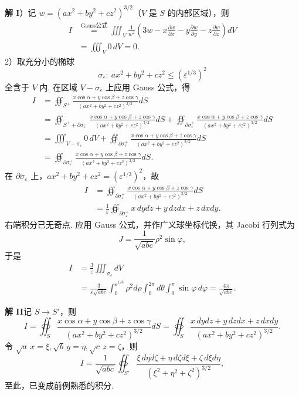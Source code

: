 \documentclass[UTF8, 12pt, fontset=fandol, oneside]{ctexart}
\providecommand{\xlongequal}[1]{\overset{#1}{=}}
\begin{document}
\noindent\textbf{解 I}）记 $w=(ax^2+by^2+cz^2)^{3/2}$（$V$ 是 $S$ 的内部区域），则
\[
\begin{aligned}
I&\xlongequal{\text{Gauss公式}}\iiint_V\frac1{w^2}\left(3w-x\frac{\partial w}{\partial x}-y\frac{\partial w}{\partial y}-z\frac{\partial w}{\partial z}\right)dV\\
&=\iiint_V0\,dV=0.
\end{aligned}
\]
2）取充分小的椭球
\[
\sigma_\varepsilon:\ ax^2+by^2+cz^2\le(\varepsilon^{1/3})^2
\]
全含于 $V$ 内. 在区域 $V-\sigma_\varepsilon$ 上应用 Gauss 公式，得
\[
\begin{aligned}
I&=\oiint_{S^+}\frac{x\cos\alpha+y\cos\beta+z\cos\gamma}{(ax^2+by^2+cz^2)^{3/2}}dS\\
&=\oiint_{S^++\partial\sigma_\varepsilon^-}\frac{x\cos\alpha+y\cos\beta+z\cos\gamma}{(ax^2+by^2+cz^2)^{3/2}}dS
+\oiint_{\partial\sigma_\varepsilon^+}\frac{x\cos\alpha+y\cos\beta+z\cos\gamma}{(ax^2+by^2+cz^2)^{3/2}}dS\\
&=\iiint_{V-\sigma_\varepsilon}0\,dV
+\oiint_{\partial\sigma_\varepsilon^+}\frac{x\cos\alpha+y\cos\beta+z\cos\gamma}{(ax^2+by^2+cz^2)^{3/2}}dS\\
&=\oiint_{\partial\sigma_\varepsilon^+}\frac{x\cos\alpha+y\cos\beta+z\cos\gamma}{(ax^2+by^2+cz^2)^{3/2}}dS.
\end{aligned}
\]
在 $\partial\sigma_\varepsilon$ 上，$ax^2+by^2+cz^2=(\varepsilon^{1/3})^2$，故
\[
\begin{aligned}
I&=\oiint_{\partial\sigma_\varepsilon^+}\frac{x\cos\alpha+y\cos\beta+z\cos\gamma}{(ax^2+by^2+cz^2)^{3/2}}dS\\
&=\frac1\varepsilon\oiint_{\partial\sigma_\varepsilon^+}x\,dydz+y\,dzdx+z\,dxdy.
\end{aligned}
\]
右端积分已无奇点. 应用 Gauss 公式，并作广义球坐标代换，其 Jacobi 行列式为
\[
J=\frac1{\sqrt{abc}}\rho^2\sin\varphi,
\]
于是
\[
\begin{aligned}
I&=\frac3\varepsilon\iiint_{\sigma_\varepsilon}dV\\
&=\frac3{\varepsilon\sqrt{abc}}\int_0^{\varepsilon^{1/3}}\rho^2d\rho
\int_0^{2\pi}d\theta\int_0^\pi\sin\varphi\,d\varphi
=\frac{4\pi}{\sqrt{abc}}.
\end{aligned}
\]

\noindent\textbf{解 II}\quad 记 $S\to S'$，则
\[
I=\oiint_S\frac{x\cos\alpha+y\cos\beta+z\cos\gamma}{(ax^2+by^2+cz^2)^{3/2}}dS
=\oiint_S\frac{x\,dydz+y\,dzdx+z\,dxdy}{(ax^2+by^2+cz^2)^{3/2}}.
\]
令 $\sqrt a\,x=\xi,\sqrt b\,y=\eta,\sqrt c\,z=\zeta$，则
\[
I=\frac1{\sqrt{abc}}\oiint_{S'}\frac{\xi\,d\eta d\zeta+\eta\,d\zeta d\xi+\zeta\,d\xi d\eta}{(\xi^2+\eta^2+\zeta^2)^{3/2}},
\]
至此，已变成前例熟悉的积分.
\end{document}
